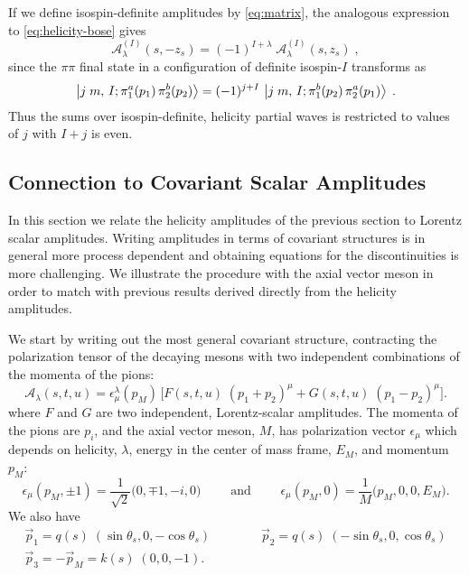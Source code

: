\documentclass[10pt, aps,prd,amsmath,amssymb,superscriptaddress,onecolumn,
nofootinbib,showpacs,preprintnumbers]{revtex4-1}
\begin{document}
If we define isospin-definite amplitudes by \cref{eq:matrix}, the analogous expression to \cref{eq:helicity-bose} gives
  \begin{equation}
    \label{eq:helicity-iso-bose}
      \mathcal{A}^{(I)}_{\lambda}(s,-z_s) = (-1)^{I + \lambda} \; \mathcal{A}^{(I)}_{\lambda}(s, z_s) \;,
  \end{equation}
since the \(\pi\pi\) final state in a configuration of definite isospin-\(I\) transforms as
  \begin{equation}
    \label{eq:pipi-iso-bose}
    \ket{j \; m, \, I ;  \pi^a_1(p_1) \, \pi^b_2(p_2)} = (-1)^{j+I} \, \ket{j \; m, \, I; \pi^b_1(p_2) \, \pi^a_2(p_1)}
    \; .
  \end{equation}
Thus the sums over isospin-definite, helicity partial waves is restricted to values of \(j\) with \(I + j\) is even.
 \subsection{Connection to Covariant Scalar Amplitudes} \label{sec:covariant}
 In this section we relate the helicity amplitudes of the previous section to Lorentz scalar amplitudes. Writing amplitudes in terms of covariant structures is in general more process dependent and obtaining equations for the discontinuities is more challenging. We illustrate the procedure with the axial vector meson in order to match with previous results derived directly from the helicity amplitudes.

   We start by writing out the most general covariant structure, contracting the polarization tensor of the decaying mesons with two independent combinations of the momenta of the pions:
   \begin{equation}
     \label{eq:covariant}
     \mathcal{A}_\lambda(s,t,u) = \epsilon_\mu^\lambda(p_M) \, \bigg[ F(s,t,u) \; (p_1 + p_2)^\mu + G(s,t,u) \;  (p_1 - p_2)^\mu \bigg].
     \end{equation}
 where \(F\) and \(G\) are two independent, Lorentz-scalar amplitudes. The momenta of the pions are \(p_i\), and the axial vector meson, \(M\), has polarization vector \(\epsilon_\mu\) which depends on helicity, \(\lambda\), energy in the center of mass frame, \(E_M\), and momentum \(p_M\):
   \begin{equation}
     \label{eq:polarization}
     \epsilon_\mu(p_M, \pm1) = \frac{1}{\sqrt{2}} \big( 0, \mp 1, - i, 0 \big) \qquad \text{ and } \qquad \epsilon_\mu(p_M, 0) = \frac{1}{M} \big( p_M, 0, 0, E_M \big).
     \end{equation}
 We also have
   \begin{gather}
     \vec{p}_1 = q(s) \; (\sin \theta_s, 0,  -\cos \theta_s) \qquad \qquad \vec{p}_2 = q(s) \; (-\sin \theta_s, 0 , \cos \theta_s ) \\
     \vec{p}_3 = - \vec{p}_M = k(s) \; (0,0,-1). \nonumber
   \end{gather}
\end{document}
